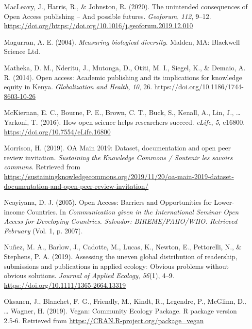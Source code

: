 \documentclass[
  english,
  man]{apa6}
\begin{document}
\leavevmode\hypertarget{ref-macleavy_unintended_2020}{}%
MacLeavy, J., Harris, R., \& Johnston, R. (2020). The unintended consequences of Open Access publishing -- And possible futures. \emph{Geoforum}, \emph{112}, 9--12. \url{https://doi.org/https://doi.org/10.1016/j.geoforum.2019.12.010}

\leavevmode\hypertarget{ref-magurran_measuring_2004}{}%
Magurran, A. E. (2004). \emph{Measuring biological diversity}. Malden, MA: Blackwell Science Ltd.

\leavevmode\hypertarget{ref-matheka_open_2014}{}%
Matheka, D. M., Nderitu, J., Mutonga, D., Otiti, M. I., Siegel, K., \& Demaio, A. R. (2014). Open access: Academic publishing and its implications for knowledge equity in Kenya. \emph{Globalization and Health}, \emph{10}, 26. \url{https://doi.org/10.1186/1744-8603-10-26}

\leavevmode\hypertarget{ref-mckiernan_how_2016}{}%
McKiernan, E. C., Bourne, P. E., Brown, C. T., Buck, S., Kenall, A., Lin, J., \ldots{} Yarkoni, T. (2016). How open science helps researchers succeed. \emph{eLife}, \emph{5}, e16800. \url{https://doi.org/10.7554/eLife.16800}

\leavevmode\hypertarget{ref-morrison_oa_2019}{}%
Morrison, H. (2019). OA Main 2019: Dataset, documentation and open peer review invitation. \emph{Sustaining the Knowledge Commons / Soutenir les savoirs communs}. Retrieved from \url{https://sustainingknowledgecommons.org/2019/11/20/oa-main-2019-dataset-documentation-and-open-peer-review-invitation/}

\leavevmode\hypertarget{ref-ncayiyana_open_2005}{}%
Ncayiyana, D. J. (2005). Open Access: Barriers and Opportunities for Lower-income Countries. In \emph{Communication given in the International Seminar Open Access for Developing Countries. Salvador: BIREME/PAHO/WHO. Retrieved February} (Vol. 1, p. 2007).

\leavevmode\hypertarget{ref-nunez_assessing_2019}{}%
Nuñez, M. A., Barlow, J., Cadotte, M., Lucas, K., Newton, E., Pettorelli, N., \& Stephens, P. A. (2019). Assessing the uneven global distribution of readership, submissions and publications in applied ecology: Obvious problems without obvious solutions. \emph{Journal of Applied Ecology}, \emph{56}(1), 4--9. \url{https://doi.org/10.1111/1365-2664.13319}

\leavevmode\hypertarget{ref-oksanen_vegan_2019}{}%
Oksanen, J., Blanchet, F. G., Friendly, M., Kindt, R., Legendre, P., McGlinn, D., \ldots{} Wagner, H. (2019). Vegan: Community Ecology Package. R package version 2.5-6. Retrieved from \url{https://CRAN.R-project.org/package=vegan}
\end{document}

